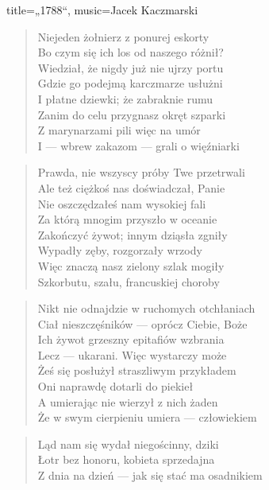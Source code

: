 \begin{song}{title={„1788“}, music={Jacek Kaczmarski}}
\begin{multicols}{2}
\begin{verse}
        Niejeden żołnierz z ponurej eskorty \\
        Bo czym się ich los od naszego różnił? \\ 
        Wiedział, że nigdy już nie ujrzy portu \\
        Gdzie go podejmą karczmarze usłużni \\ 
        I płatne dziewki; że zabraknie rumu \\
        Zanim do celu przygnasz okręt szparki \\
        Z marynarzami pili więc na umór \\
        I --- wbrew zakazom --- grali o więźniarki
    \end{verse}
    \vfill\null\columnbreak{}
    \begin{verse}
        Prawda, nie wszyscy próby Twe przetrwali \\
        Ale też ciężkoś nas doświadczał, Panie \\
        Nie oszczędzałeś nam wysokiej fali \\ 
        Za którą mnogim przyszło w oceanie \\
        Zakończyć żywot; innym dziąsła zgniły \\
        Wypadły zęby, rozgorzały wrzody \\ 
        Więc znaczą nasz zielony szlak mogiły \\
        Szkorbutu, szału, francuskiej choroby
    \end{verse}
    \begin{verse}
        Nikt nie odnajdzie w ruchomych otchłaniach \\
        Ciał nieszczęśników --- oprócz Ciebie, Boże \\
        Ich żywot grzeszny epitafiów wzbrania \\
        Lecz --- ukarani. Więc wystarczy może \\ 
        Żeś się posłużył straszliwym przykładem \\
        Oni naprawdę dotarli do piekieł \\
        A umierając nie wierzył z nich żaden \\
        Że w swym cierpieniu umiera --- człowiekiem
    \end{verse}
    \begin{verse}
        Ląd nam się wydał niegościnny, dziki \\
        Łotr bez honoru, kobieta sprzedajna \\
        Z dnia na dzień --- jak się stać ma osadnikiem \\

\end{verse}
\end{multicols}
\end{song}
